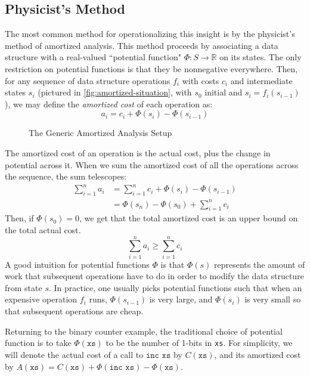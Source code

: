 \subsection{Physicist's Method}
The most common method for operationalizing this insight is by the physicist's method of amortized analysis. This method proceeds by associating a data structure with a real-valued ``potential function" $\Phi : S \to \mathbb{R}$ on its states. The only restriction on potential functions is that they be nonnegative everywhere.
Then, for any sequence of data structure operations $f_i$ with costs $c_i$ and intermediate states $s_i$ (pictured in \autoref{fig:amortized-situation}, with $s_0$ initial and $s_i = f_i(s_{i-1})$), we may define the \textit{amortized cost} of each operation as:
$$
a_i = c_i + \Phi(s_i) - \Phi(s_{i-1})
$$

\begin{figure}
  \caption{The Generic Amortized Analysis Setup}
  \label{fig:amortized-situation}
\end{figure}

The amortized cost of an operation is the actual cost, plus the change in potential across it. When we sum the amortized cost of all the operations across the sequence, the sum telescopes:
\begin{align*}
  \sum_{i=1}^n a_i &= \sum_{i=1}^n c_i + \Phi(s_i) - \Phi(s_{i-1})\\
                   &= \Phi(s_n) - \Phi(s_0) + \sum_{i=1}^n c_i
\end{align*}
Then, if $\Phi(s_0) = 0$, we get that the total amortized cost is an upper bound on the total actual cost.
$$
\sum_{i=1}^n a_i \geq \sum_{i=1}^n c_i
$$
A good intuition for potential functions $\Phi$ is that $\Phi(s)$ represents the amount of work that subsequent operations have to do in order to modify the data structure from state $s$.
In practice, one usually picks potential functions such that when an expensive operation $f_i$ runs, $\Phi(s_{i-1})$ is very large, and $\Phi(s_i)$ is very small so that subsequent operations are cheap.

Returning to the binary counter example, the traditional choice of potential function is to take $\Phi(\texttt{xs})$ to be the number of 1-bits in \texttt{xs}.
For simplicity, we will denote the actual cost of a call to $\texttt{inc xs}$ by $C(\texttt{xs})$, and its amortized cost by $A(\texttt{xs}) = C(\texttt{xs}) + \Phi(\texttt{inc xs}) - \Phi(\texttt{xs})$.

